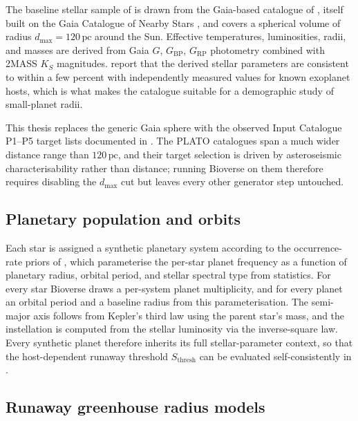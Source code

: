 The baseline stellar sample of \textcite{Schlecker2024} is drawn from
the Gaia-based catalogue of \textcite{HardegreeUllman2023}, itself
built on the Gaia Catalogue of Nearby Stars
\parencite{Smart2021}, and covers a spherical volume of radius
$d_{\max}=120\,\mathrm{pc}$ around the Sun.  Effective temperatures,
luminosities, radii, and masses are derived from Gaia $G$,
$G_{\mathrm{BP}}$, $G_{\mathrm{RP}}$ photometry combined with 2MASS
$K_S$ magnitudes.  \textcite{HardegreeUllman2023} report that the
derived stellar parameters are consistent to within a few percent
with independently measured values for known exoplanet hosts, which
is what makes the catalogue suitable for a demographic study of
small-planet radii.

This thesis replaces the generic Gaia sphere with the observed
\PLATO Input Catalogue P1--P5 target lists documented in
.  The PLATO catalogues span a much wider
distance range than $120\,\mathrm{pc}$, and their target selection
is driven by asteroseismic characterisability rather than distance;
running Bioverse on them therefore requires disabling the $d_{\max}$
cut but leaves every other generator step untouched.


\subsection{Planetary population and orbits}
\label{ssec:bioverse_planets}

Each star is assigned a synthetic planetary system according to the
occurrence-rate priors of \textcite{Bergsten2022}, which parameterise
the per-star planet frequency as a function of planetary radius,
orbital period, and stellar spectral type from \Kepler statistics.
For every star Bioverse draws a per-system planet multiplicity, and
for every planet an orbital period and a baseline radius from this
parameterisation.  The semi-major axis follows from Kepler's third
law using the parent star's mass, and the instellation is computed
from the stellar luminosity via the inverse-square law.  Every
synthetic planet therefore inherits its full stellar-parameter
context, so that the host-dependent runaway threshold
$S_\mathrm{thresh}$ can be evaluated self-consistently in
.


\subsection{Runaway greenhouse radius models}
\label{sec:runaway_models}

